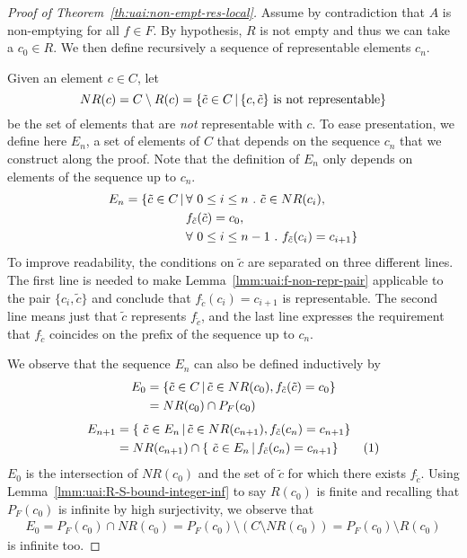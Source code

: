 \begin{proof}[Proof of Theorem~\ref{th:uai:non-empt-res-local}]
	Assume by contradiction that $A$ is non-emptying for all $f \in F$. By hypothesis, $R$ is not empty and thus we can take a $c_0 \in R$. We then define recursively a sequence of representable elements $c_n$.

	Given an element $c \in C$, let
	\begin{equation*}
		NR(c) = C \setminus R(c) = \{ \tilde{c} \in C \,\vert\, \{ c, \tilde{c} \} \text{ is not representable} \}
	\end{equation*}
	be the set of elements that are \textit{not} representable with $c$.
	To ease presentation, we define here $E_n$, a set of elements of $C$ that depends on the sequence $c_n$ that we construct along the proof. Note that the definition of $E_n$ only depends on elements of the sequence up to $c_n$.
	\begin{align*}
		E_n = \{\tilde{c} \in C \svert & \forall\ 0 \le i \le n \ .\ \tilde{c} \in NR(c_i),                \\
		                               & f_{\tilde{c}}(\tilde{c}) = c_0,                                   \\
		                               & \forall\ 0 \le i \le n - 1 \ .\ f_{\tilde{c}}(c_i) = c_{i + 1} \}
	\end{align*}
	To improve readability, the conditions on $\tilde{c}$ are separated on three different lines. The first line is needed to make Lemma~\ref{lmm:uai:f-non-repr-pair} applicable to the pair $\{ c_i, \tilde{c} \}$ and conclude that $f_{\tilde{c}}(c_i) = c_{i+1}$ is representable. The second line means just that $\tilde{c}$ represents $f_{\tilde{c}}$, and the last line expresses the requirement that $f_{\tilde{c}}$ coincides on the prefix of the sequence up to $c_n$.

	We observe that the sequence $E_n$ can also be defined inductively by
	\begin{align*}
		E_0 & = \{ \tilde{c} \in C \,\vert\, \tilde{c} \in NR(c_0), f_{\tilde{c}}(\tilde{c}) = c_0 \} \\
		    & = NR(c_0) \cap P_F(c_0)
	\end{align*}
	\begin{align*}
		E_{n+1} & = \{\ \tilde{c} \in E_n \svert \tilde{c} \in NR(c_{n+1}), f_{\tilde{c}}(c_n) = c_{n+1} \}                                                               \\
		        & = NR(c_{n+1}) \cap \{\ \tilde{c} \in E_n \svert f_{\tilde{c}}(c_n) = c_{n+1} \} \addtocounter{equation}{1}\tag{\theequation} \label{eq:uai:En-relation}
	\end{align*}
	$E_0$ is the intersection of $NR(c_0)$ and the set of $\tilde{c}$ for which there exists $f_{\tilde{c}}$. Using Lemma~\ref{lmm:uai:R-S-bound-integer-inf} to say $R(c_0)$ is finite and recalling that $P_F(c_0)$ is infinite by high surjectivity, we observe that
	\begin{align*}
		E_0 = P_F(c_0) \cap NR(c_0) = P_F(c_0) \setminus (C \setminus NR(c_0)) = P_F(c_0) \setminus R(c_0)
	\end{align*}
	is infinite too.


\end{proof}
